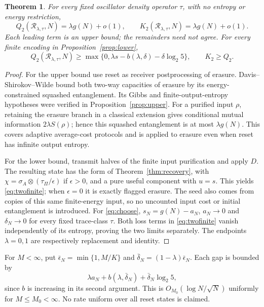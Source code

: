 \documentclass[11pt]{article}
\newtheorem{theorem}{Theorem}
\newcommand{\Rcal}{\mathcal R_{\lambda,\tau}}
\begin{document}
\begin{theorem}\label{thm:two}
For every fixed oscillator density operator $\tau$, with no entropy
or energy restriction,
\begin{equation}\label{eq:two}
 Q_2(\Rcal,N)=\lambda g(N)+o(1),\qquad
 K_2(\Rcal,N)=\lambda g(N)+o(1).
\end{equation}
Each leading term is an upper bound; the remainders need not agree.
For every finite encoding in Proposition~\ref{prop:lower},
\begin{equation}\label{eq:twofinite}
 Q_2(\Rcal,N)\ge
 \max\{0,\lambda s-b(\lambda,\delta)-\delta\log_2 5\},\qquad K_2\ge Q_2.
\end{equation}
\end{theorem}
\begin{proof}
For the upper bound use reset as receiver postprocessing of erasure.
Davis--Shirokov--Wilde \cite[Theorem 4 and equation (141)]{dsw} bound
both two-way capacities of erasure by its energy-constrained squashed
entanglement. Its Gibbs and finite-output-entropy hypotheses were
verified in Proposition~\ref{prop:upper}. For a purified input $\rho$,
retaining the erasure branch in a classical extension gives conditional
mutual information $2\lambda S(\rho)$; hence this squashed entanglement
is at most $\lambda g(N)$. This covers adaptive average-cost protocols
and is applied to erasure even when reset has infinite output entropy.

For the lower bound, transmit halves of the finite input purification
and apply $D$. The resulting state has the form of
Theorem~\ref{thm:recovery}, with
$\chi=\sigma_A\otimes(\tau_\Pi/\epsilon)$ if $\epsilon>0$,
and a pure useful component with $u=s$. This yields \eqref{eq:twofinite}; when
$\epsilon=0$ it is exactly flagged erasure. The seed also comes from
copies of this same finite-energy input, so no uncounted input cost
or initial entanglement is introduced.
For \eqref{eq:choose}, $s_N=g(N)-a_N$, $a_N\to0$ and
$\delta_N\to0$ for every fixed trace-class $\tau$.
Both loss terms in \eqref{eq:twofinite} vanish independently of its
entropy, proving the two limits separately. The endpoints $\lambda=0,1$
are respectively replacement and identity.
\end{proof}
For $M<\infty$, put $\bar\epsilon_N=\min\{1,M/K\}$ and
$\bar\delta_N=(1-\lambda)\bar\epsilon_N$. Each gap is bounded by
\begin{equation}\label{eq:tworate}
 \lambda a_N+b(\lambda,\bar\delta_N)+\bar\delta_N\log_2 5,
\end{equation}
since $b$ is increasing in its second argument. This is
$O_{M_0}(\log N/\sqrt N)$ uniformly for $M\le M_0<\infty$.
No rate uniform over all reset states is claimed.
\end{document}
